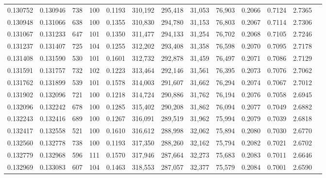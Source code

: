 \begin{tabular}{rrrrrrrrrrrrr}
0.130752 & 0.130946 &   738 & 100 &                                     0.1193 & 310,192 & 295,418 &  31,053 &  76,903 & 0.2066 & 0.7124 & 2.7365 \\
0.130948 & 0.131066 &   638 & 100 &                                     0.1355 & 310,830 & 294,780 &  31,153 &  76,803 & 0.2067 & 0.7114 & 2.7306 \\
0.131067 & 0.131233 &   647 & 101 &                                     0.1350 & 311,477 & 294,133 &  31,254 &  76,702 & 0.2068 & 0.7105 & 2.7246 \\
0.131237 & 0.131407 &   725 & 104 &                                     0.1255 & 312,202 & 293,408 &  31,358 &  76,598 & 0.2070 & 0.7095 & 2.7178 \\
0.131408 & 0.131590 &   530 & 101 &                                     0.1601 & 312,732 & 292,878 &  31,459 &  76,497 & 0.2071 & 0.7086 & 2.7129 \\
0.131591 & 0.131757 &   732 & 102 &                                     0.1223 & 313,464 & 292,146 &  31,561 &  76,395 & 0.2073 & 0.7076 & 2.7062 \\
0.131762 & 0.131899 &   539 & 101 &                                     0.1578 & 314,003 & 291,607 &  31,662 &  76,294 & 0.2074 & 0.7067 & 2.7012 \\
0.131902 & 0.132096 &   721 & 100 &                                     0.1218 & 314,724 & 290,886 &  31,762 &  76,194 & 0.2076 & 0.7058 & 2.6945 \\
0.132096 & 0.132242 &   678 & 100 &                                     0.1285 & 315,402 & 290,208 &  31,862 &  76,094 & 0.2077 & 0.7049 & 2.6882 \\
0.132243 & 0.132416 &   689 & 100 &                                     0.1267 & 316,091 & 289,519 &  31,962 &  75,994 & 0.2079 & 0.7039 & 2.6818 \\
0.132417 & 0.132558 &   521 & 100 &                                     0.1610 & 316,612 & 288,998 &  32,062 &  75,894 & 0.2080 & 0.7030 & 2.6770 \\
0.132560 & 0.132778 &   738 & 100 &                                     0.1193 & 317,350 & 288,260 &  32,162 &  75,794 & 0.2082 & 0.7021 & 2.6702 \\
0.132779 & 0.132968 &   596 & 111 &                                     0.1570 & 317,946 & 287,664 &  32,273 &  75,683 & 0.2083 & 0.7011 & 2.6646 \\
0.132969 & 0.133083 &   607 & 104 &                                     0.1463 & 318,553 & 287,057 &  32,377 &  75,579 & 0.2084 & 0.7001 & 2.6590 \\

\end{tabular}
